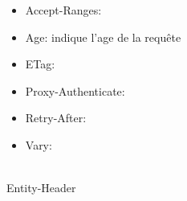 \documentclass{scrreprt}
\begin{document}
        \begin{itemize}
        \item Accept-Ranges:
        \item Age: indique l'age de la requête         
        \item ETag:       
        \item Proxy-Authenticate:  
        \item Retry-After:         
        \item Vary:                
        \end{itemize}
\\
    Entity-Header\\
\end{document}
